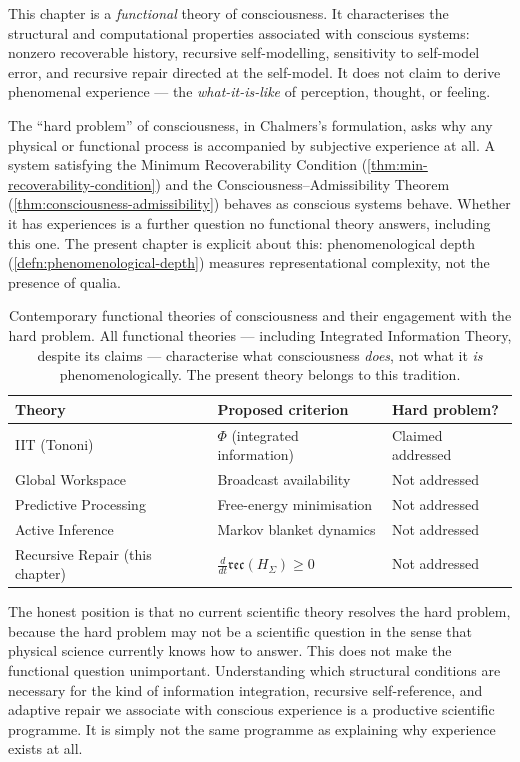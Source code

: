 \documentclass[12pt,twoside,openright]{book}
\begin{document}
This chapter is a \emph{functional} theory of consciousness.
It characterises the structural and computational properties
associated with conscious systems: nonzero recoverable
history, recursive self-modelling, sensitivity to self-model
error, and recursive repair directed at the self-model. It
does not claim to derive phenomenal experience --- the
\emph{what-it-is-like} of perception, thought, or feeling.

The ``hard problem'' of consciousness, in Chalmers's
formulation, asks why any physical or functional process is
accompanied by subjective experience at all. A system
satisfying the Minimum Recoverability Condition
(\cref{thm:min-recoverability-condition}) and the
Consciousness--Admissibility Theorem
(\cref{thm:consciousness-admissibility}) behaves as
conscious systems behave. Whether it has experiences is a
further question no functional theory answers, including
this one. The present chapter is explicit about this:
phenomenological depth (\cref{defn:phenomenological-depth})
measures representational complexity, not the presence of
qualia.

\begin{table}[h]
\centering
\small
\begin{tabular}{lll}
\toprule
Theory & Proposed criterion & Hard problem? \\
\midrule
IIT (Tononi) & $\Phi$ (integrated information) & Claimed addressed \\
Global Workspace & Broadcast availability & Not addressed \\
Predictive Processing & Free-energy minimisation & Not addressed \\
Active Inference & Markov blanket dynamics & Not addressed \\
Recursive Repair (this chapter) & $\frac{d}{dt}\mathfrak{rec}(H_\Sigma) \ge 0$ & Not addressed \\
\bottomrule
\end{tabular}
\caption{Contemporary functional theories of consciousness
and their engagement with the hard problem. All functional
theories --- including Integrated Information Theory, despite
its claims --- characterise what consciousness \emph{does},
not what it \emph{is} phenomenologically. The present
theory belongs to this tradition.}
\label{tab:consciousness-theories}
\end{table}

The honest position is that no current scientific theory
resolves the hard problem, because the hard problem may not
be a scientific question in the sense that physical science
currently knows how to answer. This does not make the
functional question unimportant. Understanding which
structural conditions are necessary for the kind of
information integration, recursive self-reference, and
adaptive repair we associate with conscious experience is
a productive scientific programme. It is simply not the
same programme as explaining why experience exists at all.
\end{document}
